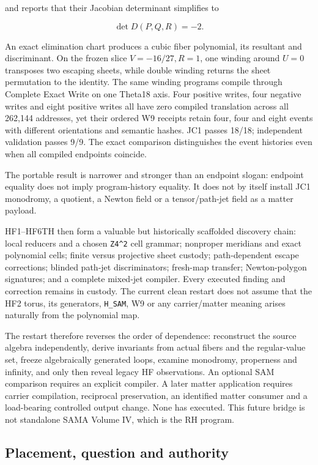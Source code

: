 and reports that their Jacobian determinant simplifies to

\[
\det D(P,Q,R)=-2.
\]

An exact elimination chart produces a cubic fiber polynomial, its
resultant and discriminant. On the frozen slice \(V=-16/27,R=1\), one
winding around \(U=0\) transposes two escaping sheets, while double
winding returns the sheet permutation to the identity. The same winding
programs compile through Complete Exact Write on one Theta18 axis. Four
positive writes, four negative writes and eight positive writes all have
zero compiled translation across all 262,144 addresses, yet their
ordered W9 receipts retain four, four and eight events with different
orientations and semantic hashes. JC1 passes 18/18; independent
validation passes 9/9. The exact comparison distinguishes the event histories even when all compiled endpoints coincide.

The portable result is narrower and stronger than an endpoint slogan:
endpoint equality does not imply program-history equality. It does not
by itself install JC1 monodromy, a quotient, a Newton field or a
tensor/path-jet field as a matter payload.

HF1--HF6TH then form a valuable but historically scaffolded discovery
chain: local reducers and a chosen \texttt{Z4\^{}2} cell grammar;
nonproper meridians and exact polynomial cells; finite versus projective
sheet custody; path-dependent escape corrections; blinded path-jet
discriminators; fresh-map transfer; Newton-polygon signatures; and a
complete mixed-jet compiler. Every executed finding and correction
remains in custody. The current clean restart does not assume that the
HF2 torus, its generators, \texttt{H\_SAM}, W9 or any carrier/matter
meaning arises naturally from the polynomial map.

The restart therefore reverses the order of dependence: reconstruct the
source algebra independently, derive invariants from actual fibers and
the regular-value set, freeze algebraically generated loops, examine
monodromy, properness and infinity, and only then reveal legacy HF
observations. An optional SAM comparison requires an explicit compiler.
A later matter application requires carrier compilation, reciprocal
preservation, an identified matter consumer and a load-bearing
controlled output change. None has executed. This future bridge is not
standalone SAMA Volume IV, which is the RH program.

\subsection{Placement, question and
authority}\label{viii-ch11-placement-question-and-authority}


